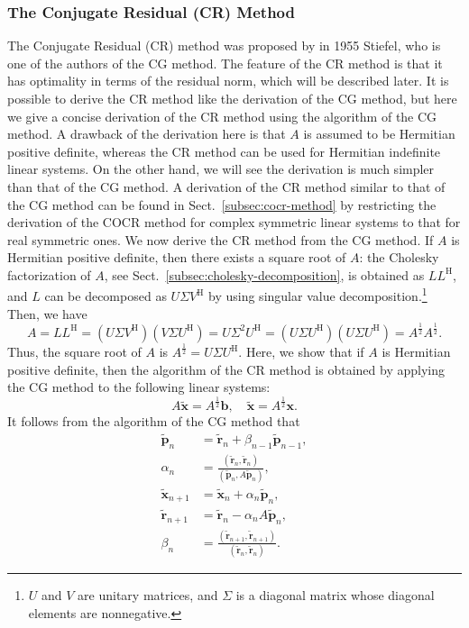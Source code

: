 \subsubsection{{The Conjugate Residual (CR) Method}}\label{subsec:conjugate-residual}
{The Conjugate Residual (CR) method  was proposed by in 1955 Stiefel, who is one of the authors of the CG method. The feature of the CR method is that it has optimality in terms of the residual norm, which will be described later.}
{It is possible to derive the CR method like the derivation of the CG method, but here we give a concise derivation of the CR method using the algorithm of the CG method. A drawback of the derivation here is that $A$ is assumed to be Hermitian positive definite, whereas the CR method can be used for Hermitian indefinite linear systems. On the other hand, we will see the derivation is much simpler than that of the CG method. A derivation of the CR method similar to that of the CG method can be found in Sect.\ \ref{subsec:cocr-method} by restricting the derivation of the COCR method for complex symmetric linear systems to that for real symmetric ones.}
{We now derive the CR method from the CG method. If $A$ is Hermitian positive definite, then there exists a square root of $A$: the Cholesky factorization of $A$, see Sect.\ \ref{subsec:cholesky-decomposition}, is obtained as $LL^{\mathrm H}$, and $L$ can be decomposed as $U\Sigma V^{\mathrm H}$ by using singular value decomposition.}\footnote{{$U$ and $V$ are unitary matrices, and $\Sigma$ is a diagonal matrix whose diagonal elements are nonnegative.}}
{Then, we have}
\[A=LL^{\mathrm H}=(U\Sigma V^{\mathrm H})(V\Sigma U^{\mathrm H})=U\Sigma^2U^{\mathrm H}=(U\Sigma U^{\mathrm H})(U\Sigma U^{\mathrm H})=A^{\frac12}A^{\frac12}.\]
{Thus, the square root of $A$ is $A^{\frac12}=U\Sigma U^{\mathrm H}$. Here, we show that if $A$ is Hermitian positive definite, then the algorithm of the CR method is obtained by applying the CG method to the following linear systems:}
\begin{equation}\label{eq:cr-square-root-system}A\widetilde{\bm x}=A^{\frac12}\bm b,\quad\widetilde{\bm x}=A^{\frac12}\bm x.\end{equation}
{It follows from the algorithm of the CG method that}
\[\begin{aligned}
\widetilde{\bm p}_n&=\widetilde{\bm r}_n+\beta_{n-1}\widetilde{\bm p}_{n-1},\\
\alpha_n&=\frac{(\widetilde{\bm r}_n,\widetilde{\bm r}_n)}{(\widetilde{\bm p}_n,A\widetilde{\bm p}_n)},\\
\widetilde{\bm x}_{n+1}&=\widetilde{\bm x}_n+\alpha_n\widetilde{\bm p}_n,\\
\widetilde{\bm r}_{n+1}&=\widetilde{\bm r}_n-\alpha_nA\widetilde{\bm p}_n,\\
\beta_n&=\frac{(\widetilde{\bm r}_{n+1},\widetilde{\bm r}_{n+1})}{(\widetilde{\bm r}_n,\widetilde{\bm r}_n)}.
\end{aligned}\]
